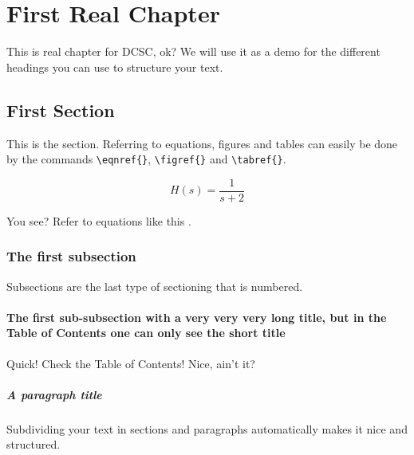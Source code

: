 %
\chapter{First Real Chapter}

This is real chapter for \ac{DCSC}, ok? We will use it as a demo for the different headings you can use to structure your text.


\section{First Section}

This is the section. Referring to equations, figures and tables can easily be done by the commands \verb"\eqnref{}", \verb"\figref{}" and \verb"\tabref{}".

\begin{equation}\label{eq:First}
	H(s) = \frac{1}{s+2}
\end{equation}

You see? Refer to equations like this .


\subsection{The first subsection}

Subsections are the last type of sectioning that is numbered. 


\subsubsection[Subsection Short Title]{The first sub-subsection with a very very very long title, but in the Table of Contents one can only see the short title}

Quick! Check the Table of Contents! Nice, ain't it?


\paragraph{A paragraph title}

Subdividing your text in sections and paragraphs automatically makes it nice and structured.